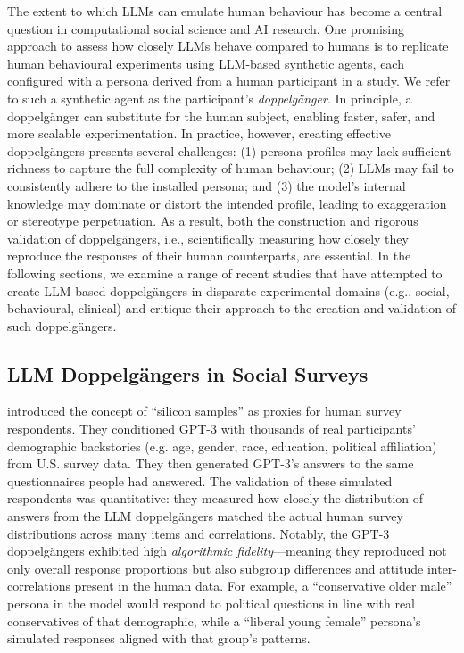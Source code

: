 The extent to which LLMs can emulate human behaviour has become a central question in computational social science and AI research. One promising approach to assess how closely LLMs behave compared to humans is to replicate human behavioural experiments using LLM-based synthetic agents, each configured with a persona derived from a human participant in a study. We refer to such a synthetic agent as the participant's \emph{doppelgänger}. In principle, a doppelgänger can substitute for the human subject, enabling faster, safer, and more scalable experimentation. In practice, however, creating effective doppelgängers presents several challenges: (1) persona profiles may lack sufficient richness to capture the full complexity of human behaviour; (2) LLMs may fail to consistently adhere to the installed persona; and (3) the model's internal knowledge may dominate or distort the intended profile, leading to exaggeration or stereotype perpetuation. As a result, both the construction and rigorous validation of doppelgängers, i.e., scientifically measuring how closely they reproduce the responses of their human counterparts, are essential. In the following sections, we examine a range of recent studies that have attempted to create LLM-based doppelgängers in disparate experimental domains (e.g., social, behavioural, clinical) and critique their approach to the creation and validation of such doppelgängers.


\subsection*{LLM Doppelgängers in Social Surveys}
\citet{argyle2023} introduced the concept of “silicon samples” as proxies for human survey respondents. They conditioned GPT-3 with thousands of real participants’ demographic backstories (e.g. age, gender, race, education, political affiliation) from U.S. survey data. They then generated GPT-3’s answers to the same questionnaires people had answered. The validation of these simulated respondents was quantitative: they measured how closely the distribution of answers from the LLM doppelgängers matched the actual human survey distributions across many items and correlations. Notably, the GPT-3 doppelgängers exhibited high \textit{algorithmic fidelity}—meaning they reproduced not only overall response proportions but also subgroup differences and attitude inter-correlations present in the human data. For example, a “conservative older male” persona in the model would respond to political questions in line with real conservatives of that demographic, while a “liberal young female” persona’s simulated responses aligned with that group’s patterns.

